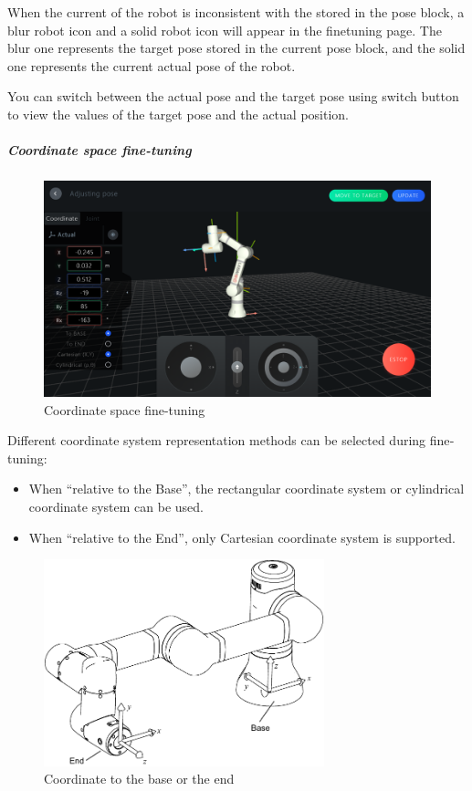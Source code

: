 When the current  of the robot is inconsistent with the  stored in the pose block, a blur robot icon and a solid robot icon will appear in the fine­tuning page. The blur one represents the target pose stored in the current pose block, and the solid one represents the current actual pose of the robot.

You can switch between the actual pose  and the target pose  using switch button to view the values of the target pose and the actual position.

\subparagraph{Coordinate space fine-tuning}

\begin{figure}[ht]
	\centering
	\includegraphics[width=\textwidth]{en/image/coor.png}
	\caption{Coordinate space fine-tuning}
	\label{fig:坐标空间微调}
\end{figure}

Different coordinate system representation methods can be selected during fine­tuning:
\begin{itemize}
	\item When ``relative to the Base'', the rectangular coordinate system or cylindrical coordinate system can be used.
	\item When ``relative to the End'', only Cartesian coordinate system is supported.
\end{itemize}

\begin{figure}[ht]
	\centering
	\includegraphics[height=6cm]{en/image/fine_tuning_coordinate.pdf}
	\caption{Coordinate to the base or the end}
	\label{fig:坐标空间示意图}
\end{figure}


